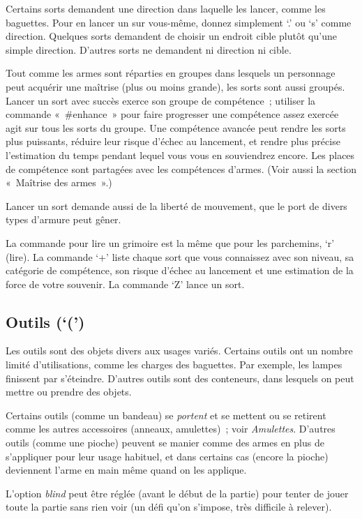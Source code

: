 \documentclass[titlepage]{article}
\begin{document}
Certains sorts demandent une direction dans laquelle les lancer, comme les
baguettes.
Pour en lancer un sur vous-même, donnez simplement `.' ou `s'
comme direction.
Quelques sorts demandent de choisir un endroit cible plutôt qu'une simple
direction.
D'autres sorts ne demandent ni direction ni cible.


Tout comme les armes sont réparties en groupes dans lesquels un
personnage peut acquérir une maîtrise (plus ou moins grande), les sorts
sont aussi groupés.
Lancer un sort avec succès exerce son groupe de compétence~; utiliser la
commande «~\#enhance~» pour faire progresser une compétence assez
exercée agit sur tous les sorts du groupe.
Une compétence avancée peut rendre les sorts plus puissants, réduire leur
risque d'échec au lancement, et rendre plus précise l'estimation du temps
pendant lequel vous vous en souviendrez encore.
Les places de compétence sont partagées avec les compétences d'armes.
(Voir aussi la section «~Maîtrise des armes~».)


Lancer un sort demande aussi de la liberté de mouvement, que le port de
divers types d'armure peut gêner.


La commande pour lire un grimoire est la même que pour les parchemins,
`r' (lire).
La commande `+' liste chaque sort que vous connaissez avec son
niveau, sa catégorie de compétence, son risque d'échec au lancement et une
estimation de la force de votre souvenir.
La commande `Z' lance un sort.

\subsection{Outils (`(')}



Les outils sont des objets divers aux usages variés.
Certains outils ont un nombre limité d'utilisations, comme les charges des
baguettes.
Par exemple, les lampes finissent par s'éteindre.
D'autres outils sont des conteneurs, dans lesquels on peut mettre ou
prendre des objets.


Certains outils (comme un bandeau) se \textit{portent} et se mettent ou se
retirent comme les autres accessoires (anneaux, amulettes)~; voir
\textit{Amulettes}.
D'autres outils (comme une pioche) peuvent se manier comme des armes en
plus de s'appliquer pour leur usage habituel, et dans certains cas
(encore la pioche) deviennent l'arme en main même quand on les applique.


L'option
\textit{blind}
peut être réglée (avant le début de la partie) pour tenter de jouer toute
la partie sans rien voir (un défi qu'on s'impose, très difficile à
relever).
\end{document}
